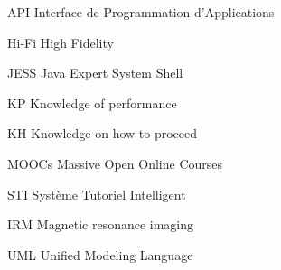 \begin{abbreviations}
    \item[API] Interface de Programmation d'Applications
    \item[Hi-Fi] High Fidelity
    \item[JESS] Java Expert System Shell
    \item[KP] Knowledge of performance
    \item[KH] Knowledge on how to proceed
     \item[MOOCs] Massive Open Online Courses
    \item[STI] Système Tutoriel Intelligent
    \item[IRM] Magnetic resonance imaging
    \item[UML] Unified Modeling Language
\end{abbreviations}

